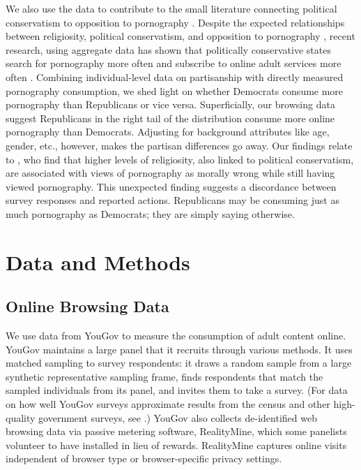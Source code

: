 \documentclass[12pt,twoside]{article}
\begin{document}
We also use the data to contribute to the small literature connecting political conservatism to opposition to pornography \citep{Peek1982-ua, Woodrum1992-vk}. Despite the expected relationships between religiosity, political conservatism, and opposition to pornography \citep{Wright2013-an, Perry2018-cn}, recent research, using aggregate data has shown that politically conservative states search for pornography more often and subscribe to online adult services more often \citep{macinnis2015american, edelman2009markets}. Combining individual-level data on partisanship with directly measured pornography consumption, we shed light on whether Democrats consume more pornography than Republicans or vice versa. Superficially, our browsing data suggest Republicans in the right tail of the distribution consume more online pornography than Democrats. Adjusting for background attributes like age, gender, etc., however, makes the partisan differences go away. Our findings relate to \cite{Perry2018-cn}, who find that higher levels of religiosity, also linked to political conservatism, are associated with views of pornography as morally wrong while still having viewed pornography. This unexpected finding suggests a discordance between survey responses and reported actions. Republicans may be consuming just as much pornography as Democrats; they are simply saying otherwise. 


\section{Data and Methods}
\label{sec:data}

\subsection{Online Browsing Data}
\label{subsec:online_browse_data}

We use data from YouGov to measure the consumption of adult content online. YouGov maintains a large panel that it recruits through various methods. It uses matched sampling to survey respondents: it draws a random sample from a large synthetic representative sampling frame, finds respondents that match the sampled individuals from its panel, and invites them to take a survey. (For data on how well YouGov surveys approximate results from the census and other high-quality government surveys, see \citet{rivers2009, graham2021advantages, foote2021measuring}.) YouGov also collects de-identified web browsing data via passive metering software, RealityMine, which some panelists volunteer to have installed in lieu of rewards. RealityMine captures online visits independent of browser type or browser-specific privacy settings.
\end{document}
